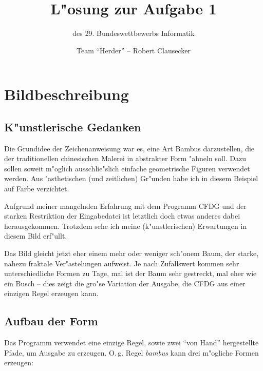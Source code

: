 \documentclass{scrreprt}
\author {Team "`Herder"' -- Robert Clausecker}
\title {L"osung zur Aufgabe 1}
\subtitle {des 29. Bundeswettbewerbs Informatik}
\begin{document}
\maketitle

\tableofcontents \newpage

\chapter{Bildbeschreibung}

\section{K"unstlerische Gedanken}
Die Grundidee der Zeichenanweisung war es, eine Art Bambus darzustellen, die der
traditionellen chinesischen Malerei in abstrakter Form "ahneln soll.  Dazu
sollen soweit m"oglich ausschlie"slich einfache geometrische Figuren verwendet
werden.  Aus "asthetischen (und zeitlichen) Gr"unden habe ich in diesem Beispiel
auf Farbe verzichtet.

Aufgrund meiner mangelnden Erfahrung mit dem Programm CFDG und der starken
Restriktion der Eingabedatei ist letztlich doch etwas anderes dabei
herausgekommen.  Trotzdem sehe ich meine (k"unstlerischen) Erwartungen in diesem
Bild erf"ullt.

Das Bild gleicht jetzt eher einem mehr oder weniger sch"onem Baum, der starke,
nahezu fraktale Ver"astelungen aufweist.  Je nach Zufallswert kommen sehr
unterschiedliche Formen zu Tage, mal ist der Baum sehr gestreckt, mal eher wie
ein Busch -- dies zeigt die gro"se Variation der Ausgabe, die CFDG aus einer
einzigen Regel erzeugen kann.

\section{Aufbau der Form}

Das Programm verwendet eine einzige Regel, sowie zwei "`von Hand"' hergestellte
Pfade, um Ausgabe zu erzeugen.  O.\,g. Regel \emph{bambus} kann drei m"ogliche
Formen erzeugen:
\end{document}
